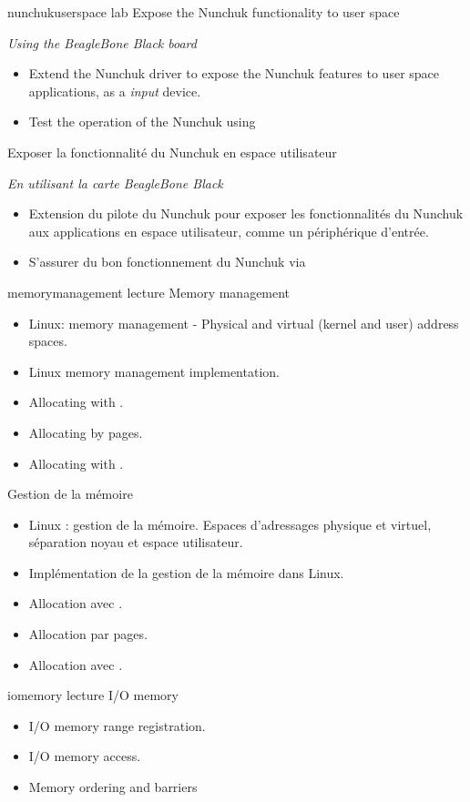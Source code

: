 {nunchukuserspace}
{lab}
{Expose the Nunchuk functionality to user space}
{
  {\em Using the BeagleBone Black board}
  \begin{itemize}
  \item Extend the Nunchuk driver to expose the Nunchuk features to
    user space applications, as a {\em input} device.
  \item Test the operation of the Nunchuk using 
  \end{itemize}
}
{Exposer la fonctionnalité du Nunchuk en espace utilisateur}
{
  {\em En utilisant la carte BeagleBone Black}
  \begin{itemize}
  \item Extension du pilote du Nunchuk pour exposer les fonctionnalités
    du Nunchuk aux applications en espace utilisateur, comme
    un périphérique d'entrée.
  \item S'assurer du bon fonctionnement du Nunchuk via 
  \end{itemize}
}
{memorymanagement}
{lecture}
{Memory management}
{
  \begin{itemize}
  \item Linux: memory management - Physical and virtual (kernel and user) address spaces.
  \item Linux memory management implementation.
  \item Allocating with .
  \item Allocating by pages.
  \item Allocating with .
  \end{itemize}
}
{Gestion de la mémoire}
{
  \begin{itemize}
  \item Linux : gestion de la mémoire. Espaces d'adressages physique et
     virtuel, séparation noyau et espace utilisateur.
  \item Implémentation de la gestion de la mémoire dans Linux.
  \item Allocation avec .
  \item Allocation par pages.
  \item Allocation avec .
  \end{itemize}
}
{iomemory}
{lecture}
{I/O memory}
{
  \begin{itemize}
  \item I/O memory range registration.
  \item I/O memory access.
  \item Memory ordering and barriers
  \end{itemize}
}
